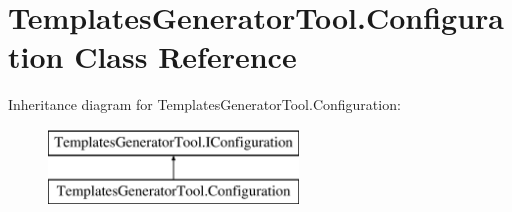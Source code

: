 \hypertarget{class_templates_generator_tool_1_1_configuration}{}\section{Templates\+Generator\+Tool.\+Configuration Class Reference}
\label{class_templates_generator_tool_1_1_configuration}
Inheritance diagram for Templates\+Generator\+Tool.\+Configuration\+:\begin{figure}[H]
\begin{center}
\leavevmode
\includegraphics[height=2.000000cm]{class_templates_generator_tool_1_1_configuration}
\end{center}
\end{figure}
